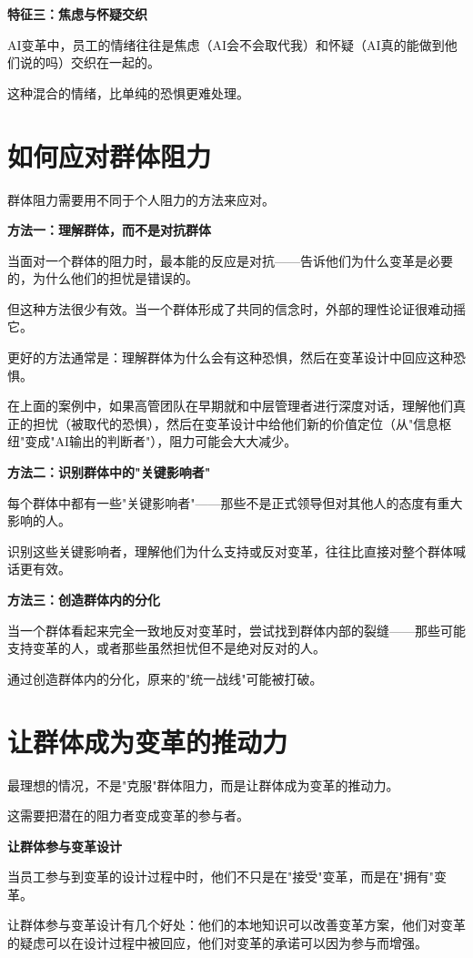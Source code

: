 \textbf{特征三：焦虑与怀疑交织}

AI变革中，员工的情绪往往是焦虑（AI会不会取代我）和怀疑（AI真的能做到他们说的吗）交织在一起的。

这种混合的情绪，比单纯的恐惧更难处理。

\section{如何应对群体阻力}


群体阻力需要用不同于个人阻力的方法来应对。

\textbf{方法一：理解群体，而不是对抗群体}

当面对一个群体的阻力时，最本能的反应是对抗——告诉他们为什么变革是必要的，为什么他们的担忧是错误的。

但这种方法很少有效。当一个群体形成了共同的信念时，外部的理性论证很难动摇它。

更好的方法通常是：理解群体为什么会有这种恐惧，然后在变革设计中回应这种恐惧。

在上面的案例中，如果高管团队在早期就和中层管理者进行深度对话，理解他们真正的担忧（被取代的恐惧），然后在变革设计中给他们新的价值定位（从"信息枢纽"变成"AI输出的判断者"），阻力可能会大大减少。

\textbf{方法二：识别群体中的"关键影响者"}

每个群体中都有一些"关键影响者"——那些不是正式领导但对其他人的态度有重大影响的人。

识别这些关键影响者，理解他们为什么支持或反对变革，往往比直接对整个群体喊话更有效。

\textbf{方法三：创造群体内的分化}

当一个群体看起来完全一致地反对变革时，尝试找到群体内部的裂缝——那些可能支持变革的人，或者那些虽然担忧但不是绝对反对的人。

通过创造群体内的分化，原来的"统一战线"可能被打破。

\section{让群体成为变革的推动力}


最理想的情况，不是"克服"群体阻力，而是让群体成为变革的推动力。

这需要把潜在的阻力者变成变革的参与者。

\textbf{让群体参与变革设计}

当员工参与到变革的设计过程中时，他们不只是在"接受"变革，而是在"拥有"变革。

让群体参与变革设计有几个好处：他们的本地知识可以改善变革方案，他们对变革的疑虑可以在设计过程中被回应，他们对变革的承诺可以因为参与而增强。

